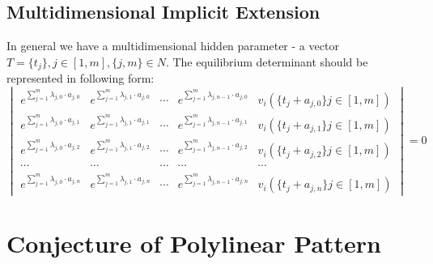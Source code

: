 \documentclass[a4paper, 11pt, oneside]{book}
\begin{document}
\subsection{Multidimensional Implicit Extension}\label{multidimensional-implicit-extension}
In general we have a multidimensional hidden parameter - a vector $T = \{t_j\}, j \in [1, m], \{j, m\} \in N$. The equilibrium determinant should be represented in following form:
\begin{equation}\label{eq:monolinear-implicit-multidimensional-f-pattern}
  \begin{vmatrix}
    e^{\sum_{j = 1}^m \lambda_{j, 0} \cdot a_{j, 0}} & e^{\sum_{j = 1}^m \lambda_{j, 1} \cdot a_{j, 0}} & \cdots & e^{\sum_{j = 1}^m \lambda_{j, n - 1} \cdot a_{j, 0}} & v_i(\{t_j + a_{j, 0}\} j \in [1, m]) \\
    e^{\sum_{j = 1}^m \lambda_{j, 0} \cdot a_{j, 1}} & e^{\sum_{j = 1}^m \lambda_{j, 1} \cdot a_{j, 1}} & \cdots & e^{\sum_{j = 1}^m \lambda_{j, n - 1} \cdot a_{j, 1}} & v_i(\{t_j + a_{j, 1}\} j \in [1, m]) \\
    e^{\sum_{j = 1}^m \lambda_{j, 0} \cdot a_{j, 2}} & e^{\sum_{j = 1}^m \lambda_{j, 1} \cdot a_{j, 2}} & \cdots & e^{\sum_{j = 1}^m \lambda_{j, n - 1} \cdot a_{j, 2}} & v_i(\{t_j + a_{j, 2}\} j \in [1, m]) \\
    \cdots & \cdots & \cdots & \cdots & \cdots \\
    e^{\sum_{j = 1}^m \lambda_{j, 0} \cdot a_{j, n}} & e^{\sum_{j = 1}^m \lambda_{j, 1} \cdot a_{j, n}} & \cdots & e^{\sum_{j = 1}^m \lambda_{j, n - 1} \cdot a_{j, n}} & v_i(\{t_j + a_{j, n}\} j \in [1, m])
  \end{vmatrix}
  =0
\end{equation}

\section{Conjecture of Polylinear Pattern}
\end{document}
